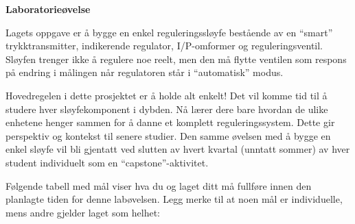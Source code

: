 

\noindent
{\bf Laboratorieøvelse}

\vskip 5pt

Lagets oppgave er å bygge en enkel reguleringssløyfe bestående av en ``smart'' trykktransmitter, indikerende regulator, I/P-omformer og reguleringsventil.  Sløyfen trenger ikke å regulere noe reelt, men den må flytte ventilen som respons på endring i målingen når regulatoren står i ``automatisk'' modus.

Hovedregelen i dette prosjektet er å holde alt enkelt!  Det vil komme tid til å studere hver sløyfekomponent i dybden.  Nå lærer dere bare hvordan de ulike enhetene henger sammen for å danne et komplett reguleringssystem.  Dette gir perspektiv og kontekst til senere studier.  Den samme øvelsen med å bygge en enkel sløyfe vil bli gjentatt ved slutten av hvert kvartal (unntatt sommer) av hver student individuelt som en ``capstone''-aktivitet.


Følgende tabell med mål viser hva du og laget ditt må fullføre innen den planlagte tiden for denne labøvelsen.  Legg merke til at noen mål er individuelle, mens andre gjelder laget som helhet:

\vskip 10pt



